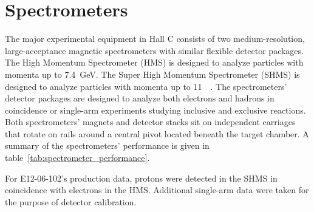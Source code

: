 \section{Spectrometers}
The major experimental equipment in Hall C consists of two medium-resolution,
large-acceptance magnetic spectrometers with similar flexible detector
packages.
The High Momentum Spectrometer (HMS) is designed to analyze particles with
momenta up to \SI{7.4}{\giga\electronvolt}.
The Super High Momentum Spectrometer (SHMS) is designed to analyze particles
with momenta up to \SI{11}{\giga\electronvoltj}.
The spectrometers' detector packages are designed to analyze both electrons
and hadrons in coincidence or single-arm experiments studying inclusive and
exclusive reactions.
Both spectrometers' magnets and detector stacks sit on independent carriages
that rotate on rails around a central pivot located beneath the target chamber.
A summary of the spectrometers' performance is given in
table~\ref{tab:spectrometer_performance}.


For E12-06-102's production data, protons were detected in the SHMS in
coincidence with electrons in the HMS.
Additional single-arm data were taken for the purpose of detector calibration.

